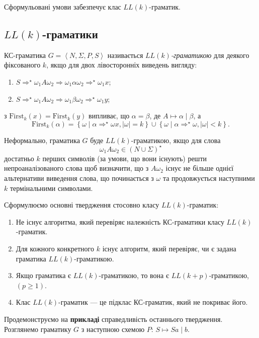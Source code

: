 Сформульовані умови забезпечує клас $LL(k)$-граматик.

\subsection{$LL(k)$-граматики}

КС-граматика $G = \left\langle N, \Sigma, P, S \right\rangle$ називається \textit{$LL(k)$-граматикою} для деякого фіксованого $k$, якщо для двох лівосторонніх виведень вигляду:
\begin{enumerate}
	\item $S \Rightarrow^\star \omega_1 A \omega_2 \Rightarrow \omega_1 \alpha \omega_2 \Rightarrow^\star \omega_1 x$;
	\item $S \Rightarrow^\star \omega_1 A \omega_2 \Rightarrow \omega_1 \beta \omega_2 \Rightarrow^\star \omega_1 y$;
\end{enumerate}
з $\text{First}_k (x) = \text{First}_k (y)$ випливає, що $\alpha = \beta$, де $A \mapsto \alpha \mid \beta$, а \[\text{First}_k(\alpha) = \left\{ \omega \mid \alpha \Rightarrow^\star \omega x,\vert\omega\vert = k \right\} \cup \left\{ \omega \mid \alpha \Rightarrow^\star \omega, \vert\omega\vert < k \right\}.\]

Неформально, граматика $G$ буде $LL(k)$-граматикою, якщо для слова \[\omega_1 A \omega_2 \in (N \cup \Sigma)^\star\] достатньо $k$ перших символів (за умови, що вони існують) решти непроаналізованого слова щоб визначити, що з $A \omega_2$ існує не більше однієї альтернативи виведення слова, що починається з $\omega$ та продовжується наступними $k$ термінальними символами. \medskip

Сформулюємо основні твердження стосовно класу $LL(k)$-граматик:
\begin{enumerate}
	\item Не існує алгоритма, який перевіряє належність КС-граматики класу $LL(k)$-граматик.
	\item Для кожного конкретного $k$ існує алгоритм, який перевіряє, чи є задана граматика $LL(k)$-граматикою.
	\item Якщо граматика є $LL(k)$-граматикою, то вона є $LL(k + p)$-граматикою, $(p \ge 1)$.
	\item Клас $LL(k)$-граматик --- це підклас КС-граматик, який не покриває його.
\end{enumerate}

Продемонструємо на \textbf{прикладі} справедливість останнього твердження. Розглянемо граматику $G$ з наступною схемою $P$: $S \mapsto S a \mid b$. \medskip

